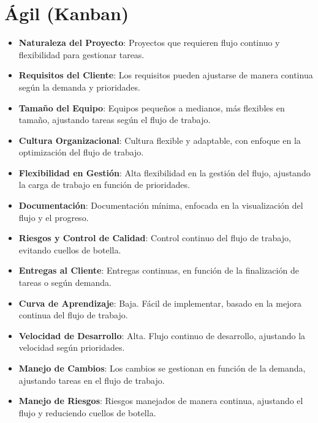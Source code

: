 \documentclass[main.tex]{subfiles}
\begin{document}
\section{Ágil (Kanban)}
\begin{itemize}
    \item \textbf{Naturaleza del Proyecto}: Proyectos que requieren flujo continuo y flexibilidad para gestionar tareas.
    \item \textbf{Requisitos del Cliente}: Los requisitos pueden ajustarse de manera continua según la demanda y prioridades.
    \item \textbf{Tamaño del Equipo}: Equipos pequeños a medianos, más flexibles en tamaño, ajustando tareas según el flujo de trabajo.
    \item \textbf{Cultura Organizacional}: Cultura flexible y adaptable, con enfoque en la optimización del flujo de trabajo.
    \item \textbf{Flexibilidad en Gestión}: Alta flexibilidad en la gestión del flujo, ajustando la carga de trabajo en función de prioridades.
    \item \textbf{Documentación}: Documentación mínima, enfocada en la visualización del flujo y el progreso.
    \item \textbf{Riesgos y Control de Calidad}: Control continuo del flujo de trabajo, evitando cuellos de botella.
    \item \textbf{Entregas al Cliente}: Entregas continuas, en función de la finalización de tareas o según demanda.
    \item \textbf{Curva de Aprendizaje}: Baja. Fácil de implementar, basado en la mejora continua del flujo de trabajo.
    \item \textbf{Velocidad de Desarrollo}: Alta. Flujo continuo de desarrollo, ajustando la velocidad según prioridades.
    \item \textbf{Manejo de Cambios}: Los cambios se gestionan en función de la demanda, ajustando tareas en el flujo de trabajo.
    \item \textbf{Manejo de Riesgos}: Riesgos manejados de manera continua, ajustando el flujo y reduciendo cuellos de botella.
\end{itemize}
\end{document}
